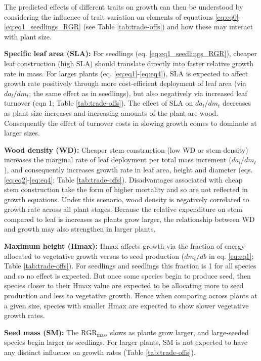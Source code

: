 \documentclass[a4paper,11pt]{article}
\begin{document}
\begin{appendices}
The predicted effects of different traits on growth can then be understood by considering the influence of trait variation on elements of equations  \ref{eq:eq0}-\ref{eq:eq1_seedlings_RGR} (see Table \ref{tab:trade-offs}) and how these may interact with plant size.


\textbf{Specific leaf area (SLA):} For seedlings (eq. \ref{eq:eq1_seedlings_RGR}), cheaper leaf construction (high SLA) should translate directly into faster relative growth rate in mass. For larger plants (eq. \ref{eq:eq1}-\ref{eq:eq4}), SLA is expected to affect growth rate positively through more cost-efficient deployment of leaf area (via $da_l/dm_t$; the same effect as in seedlings), but also negatively via increased leaf turnover (eqn 1; Table \ref{tab:trade-offs}). The effect of SLA on $da_l/dm_t$ decreases as plant size increases and increasing amounts of the plant are wood. Consequently the effect of turnover costs in slowing growth comes to dominate at larger sizes.

\textbf{Wood density (WD):} Cheaper stem construction (low WD or stem density) increases the marginal rate of leaf deployment per total mass increment ($da_l/dm_t$), and consequently increases growth rate in leaf area, height and diameter (eqs. \ref{eq:eq2}-\ref{eq:eq4}; Table \ref{tab:trade-offs}). Disadvantages associated with cheap stem construction take the form of higher mortality and so are not reflected in growth equations. Under this scenario, wood density is negatively correlated to growth rate across all plant stages. Because the relative expenditure on stem compared to leaf is increases as plants grow larger, the relationship between WD and growth may also strengthen in larger plants.

\textbf{Maximum height (Hmax):} Hmax affects growth via the fraction of energy allocated to vegetative growth versus to seed production ($dm_t/db$ in eq. \ref{eq:eq1}; Table \ref{tab:trade-offs}). For seedlings and seedlings this fraction is 1 for all species and so no effect is expected. But once some species begin to produce seed, then species closer to their Hmax value are expected to be allocating more to seed production and less to vegetative growth. Hence when comparing across plants at a given size, species with smaller Hmax are expected to show slower vegetative growth rates.

\textbf{Seed mass (SM):} The $\textrm{RGR}_{\textrm{mass}}$ slows as plants grow larger, and large-seeded species begin larger as seedlings. For larger plants, SM is not expected to have any distinct influence on growth rates  (Table \ref{tab:trade-offs}).


\end{appendices}
\end{document}
